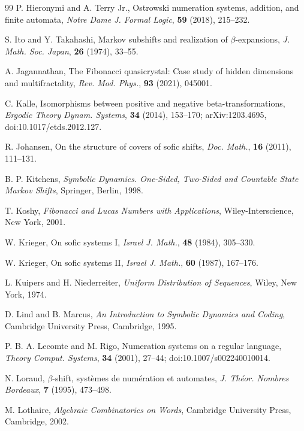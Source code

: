 \begin{thebibliography}{99}
P. Hieronymi and A. Terry Jr., Ostrowski numeration systems, addition, and
finite automata, \textit{Notre Dame J. Formal Logic}, \textbf{59} (2018),
215--232.

S. Ito and Y. Takahashi, Markov subshifts and realization of
$\beta$-expansions, \textit{J. Math. Soc. Japan}, \textbf{26} (1974), 33--55.

A. Jagannathan, The Fibonacci quasicrystal: Case study of hidden dimensions and multifractality, \textit{Rev. Mod. Phys.}, \textbf{93} (2021), 045001.

C. Kalle, Isomorphisms between positive and negative beta-transformations,
\textit{Ergodic Theory Dynam. Systems}, \textbf{34} (2014), 153--170;
arXiv:1203.4695, doi:10.1017/etds.2012.127.

R. Johansen, On the structure of covers of sofic shifts, \textit{Doc. Math.}, \textbf{16} (2011), 111--131.

B. P. Kitchens, \textit{Symbolic Dynamics. One-Sided, Two-Sided and Countable State Markov Shifts}, Springer, Berlin, 1998.

T. Koshy, \textit{Fibonacci and Lucas Numbers with Applications}, Wiley-Interscience, New York, 2001.

W. Krieger, On sofic systems I, \textit{Israel J. Math.}, \textbf{48} (1984), 305--330.

W. Krieger, On sofic systems II, \textit{Israel J. Math.}, \textbf{60} (1987), 167--176.

L. Kuipers and H. Niederreiter, \textit{Uniform Distribution of Sequences}, Wiley, New York, 1974.

D. Lind and B. Marcus, \textit{An Introduction to Symbolic Dynamics and Coding}, Cambridge University Press, Cambridge, 1995.

P. B. A. Lecomte and M. Rigo, Numeration systems on a regular language,
\textit{Theory Comput. Systems}, \textbf{34} (2001), 27--44;
doi:10.1007/s002240010014.

N. Loraud, $\beta$-shift, syst\`emes de num\'eration et automates,
\textit{J. Th\'eor. Nombres Bordeaux}, \textbf{7} (1995), 473--498.

M. Lothaire, \textit{Algebraic Combinatorics on Words}, Cambridge University Press, Cambridge, 2002.


\end{thebibliography}
